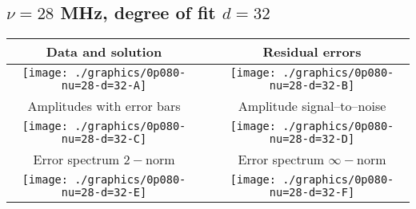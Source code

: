 

% 

\clearpage{}
\break{}

\subsection{$\nu = 28$ MHz, degree of fit $d = 32$}

\begin{table}[h]
    \begin{center}
        \begin{tabular}{ccc}
            Data and solution & \quad & Residual errors \\\hline
            \texttt{[image: ./graphics/0p080-nu=28-d=32-A]} &&
            \texttt{[image: ./graphics/0p080-nu=28-d=32-B]} \\[15pt]
            Amplitudes with error bars && Amplitude signal--to--noise \\\hline
            \texttt{[image: ./graphics/0p080-nu=28-d=32-C]} &&
            \texttt{[image: ./graphics/0p080-nu=28-d=32-D]} \\[15pt]
            Error spectrum $2-$norm && Error spectrum $\infty-$norm \\\hline
            \texttt{[image: ./graphics/0p080-nu=28-d=32-E]} &&
            \texttt{[image: ./graphics/0p080-nu=28-d=32-F]} \\[15pt]
        \end{tabular}
    \end{center}
\label{fig:elev=80, nu=28}
\end{table}



\endinput
